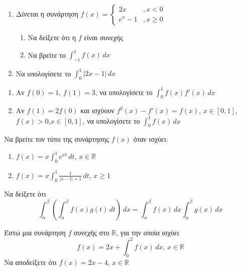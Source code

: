 \documentclass{presentation}
\begin{document}
\begin{askisi}
    \begin{enumerate}[<+->]
        \item Δίνεται η συνάρτηση $f(x)=\begin{cases}
                      2x    & ,  x<0   \\
                      e^x-1 & ,  x\ge0
                  \end{cases}$
              \begin{enumerate}[<+->]
                  \item Να δείξετε ότι η $f$ είναι συνεχής
                  \item Να βρείτε το $\int_{-1}^{1}f(x)\, dx$
              \end{enumerate}
        \item Να υπολογίσετε το $\int_{0}^{1}|2x-1|\, dx$
    \end{enumerate}
\end{askisi}

\begin{askisi}
    \begin{enumerate}[<+->]
        \item Αν $f(0)=1$, $f(1)=3$, να υπολογίσετε το $\int_{0}^{1}f(x)f'(x)\, dx$
        \item Αν $f(1)=2f(0)$ και ισχύουν $f^2(x)-f'(x)=f(x)$, $x\in [0,1]$, $f(x)>0$,$x\in [0,1]$, να υπολογίσετε το $\int_{0}^{1}f(x)\, dx$
    \end{enumerate}
\end{askisi}

\begin{askisi}
    Να βρείτε τον τύπο της συνάρτησης $f(x)$ όταν ισχύει:
    \begin{enumerate}[<+->]
        \item $f(x)=x\int_{0}^{1}e^{xt}\, dt$, $x\in\mathbb{R}$
        \item $f(x)=x\int_{0}^{1}\frac{1}{|x-t|+1}\, dt$, $x\ge 1$
    \end{enumerate}
\end{askisi}

\begin{askisi}
    Να δείξετε ότι $$\int_{α}^{β}\left( \int_{α}^{β}f(x)g(t) \, dt \right) \, dx=\int_{α}^{β}f(x) \, dx\int_{α}^{β}g(x) \, dx$$
\end{askisi}

\begin{askisi}
    Έστω μια συνάρτηση $f$ συνεχής στο $\mathbb{R}$, για την οποία ισχύει
    $$f(x)=2x+\int_{0}^{2}f(x) \, dx \text{, } x\in\mathbb{R}$$
    Να αποδείξετε ότι $f(x)=2x-4$, $x\in\mathbb{R}$
\end{askisi}
\end{document}
